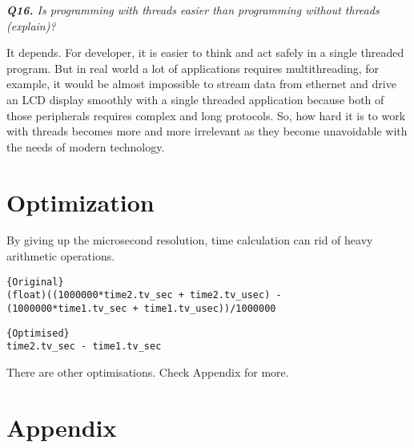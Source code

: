 \documentclass[11pt]{article}
\begin{document}
\vspace{5mm}
\textit{\textbf{Q16.} Is programming with threads easier than programming without threads (explain)?}
\vspace{5mm}

It depends. For developer, it is easier to think and act safely in a single threaded program. But in real world a lot of applications requires multithreading, for example, it would be almost impossible to stream data from ethernet and drive an LCD display smoothly with a single threaded application because both of those peripherals requires complex and long protocols. So, how hard it is to work with threads becomes more and more irrelevant as they become unavoidable with the needs of modern technology.

\section*{Optimization}

By giving up the microsecond resolution, time calculation can rid of heavy arithmetic operations.

\begin{lstlisting}[title=Original,frame=tlrb]{Original}
(float)((1000000*time2.tv_sec + time2.tv_usec) - 
(1000000*time1.tv_sec + time1.tv_usec))/1000000
\end{lstlisting}


\begin{lstlisting}[title=Optimised,frame=tlrb]{Optimised}
time2.tv_sec - time1.tv_sec
\end{lstlisting}

There are other optimisations. Check Appendix for more.

\section*{Appendix}

\thispagestyle{empty}
\end{document}
